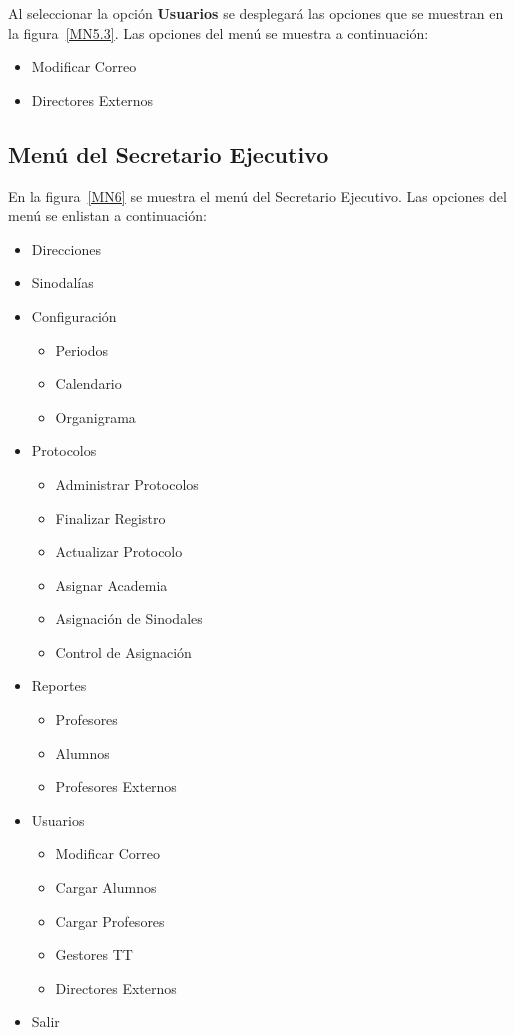 	
	
	Al seleccionar la opción \textbf{Usuarios} se desplegará las opciones que se muestran en la figura~\ref{MN5.3}. Las opciones del menú se muestra a continuación:
	\begin{itemize}
		\item Modificar Correo
		\item Directores Externos
	\end{itemize}

	
\subsection{Menú del Secretario Ejecutivo}

	En la figura~\ref{MN6} se muestra el menú del Secretario Ejecutivo. Las opciones del menú se enlistan a continuación:
	\begin{itemize}
		\item Direcciones
		\item Sinodalías
		\item Configuración
		\begin{itemize}
			\item Periodos
			\item Calendario
			\item Organigrama
		\end{itemize}
		\item Protocolos
		\begin{itemize}
			\item Administrar Protocolos
			\item Finalizar Registro
			\item Actualizar Protocolo
			\item Asignar Academia
			\item Asignación de Sinodales
			\item Control de Asignación
		\end{itemize}
		\item Reportes
		\begin{itemize}
			\item Profesores
			\item Alumnos
			\item Profesores Externos
		\end{itemize}
		\item Usuarios
		\begin{itemize}
			\item Modificar Correo
			\item Cargar Alumnos
			\item Cargar Profesores
			\item Gestores TT
			\item Directores Externos
		\end{itemize}
		\item Salir
	\end{itemize}
	
